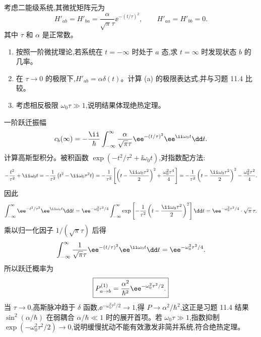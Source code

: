 \begin{question}
考虑二能级系统,其微扰矩阵元为
\[
H'_{ab}=H'_{ba}=\frac{\alpha}{\sqrt{\pi}\tau}\ee^{-(t/\tau)^2},\qquad H'_{aa}=H'_{bb}=0.
\]
其中 $\tau$ 和 $\alpha$ 是正常数。
\begin{enumerate}
\item 按照一阶微扰理论,若系统在 $t=-\infty$ 时处于 $a$ 态,求 $t=\infty$ 时发现状态 $b$ 的几率。
\item 在 $\tau\to0$ 的极限下,$H'_{ab}=\alpha\delta(t)$。计算 (a) 的极限表达式,并与习题 11.4 比较。
\item 考虑相反极限 $\omega_0\tau\gg1$,说明结果体现绝热定理。
\end{enumerate}
\end{question}
\begin{solution}
一阶跃迁振幅
\[
c_b(\infty)=-{\ii\over\hbar}\int_{-\infty}^{\infty}{\alpha\over\sqrt\pi\tau}\ee^{-(t/\tau)^2}\ee^{\ii\omega_0t}\dd t.
\]
计算高斯型积分。被积函数 $\exp(-t^2/\tau^2+\ii\omega_0t)$,对指数配方法:
\[
-{t^2\over\tau^2}+\ii\omega_0t
=-{1\over\tau^2}\left(t^2-\ii\omega_0\tau^2 t\right)
=-{1\over\tau^2}\left[\left(t-{\ii\omega_0\tau^2\over2}\right)^2+{\omega_0^2\tau^4\over4}\right]
=-{1\over\tau^2}\left(t-{\ii\omega_0\tau^2\over2}\right)^2-{\omega_0^2\tau^2\over4}.
\]
因此
\[
\int_{-\infty}^{\infty}\ee^{-t^2/\tau^2}\ee^{\ii\omega_0t}\dd t
=\ee^{-\omega_0^2\tau^2/4}\int_{-\infty}^{\infty}
\exp\left[-{1\over\tau^2}\left(t-{\ii\omega_0\tau^2\over2}\right)^2\right]\dd t
=\ee^{-\omega_0^2\tau^2/4}\cdot\sqrt\pi\,\tau.
\]
乘以归一化因子 $1/(\sqrt\pi\tau)$ 后得
\[
\int_{-\infty}^{\infty}{1\over\sqrt\pi\tau}\ee^{-(t/\tau)^2}\ee^{\ii\omega_0t}\dd t=\ee^{-\omega_0^2\tau^2/4}.
\]
所以跃迁概率为
\[
\boxed{P_{a\to b}^{(1)}={\alpha^2\over\hbar^2}\ee^{-\omega_0^2\tau^2/2}.}
\]
当 $\tau\to0$,高斯脉冲趋于 $\delta$ 函数,$\ee^{-\omega_0^2\tau^2/2}\to1$,得 $P\to\alpha^2/\hbar^2$,这正是习题 11.4 结果 $\sin^2(\alpha/\hbar)$ 在弱耦合 $\alpha/\hbar\ll1$ 时的展开首项。若 $\omega_0\tau\gg1$,指数抑制 $\exp(-\omega_0^2\tau^2/2)\to0$,说明缓慢扰动不能有效激发非简并系统,符合绝热定理。
\end{solution}

